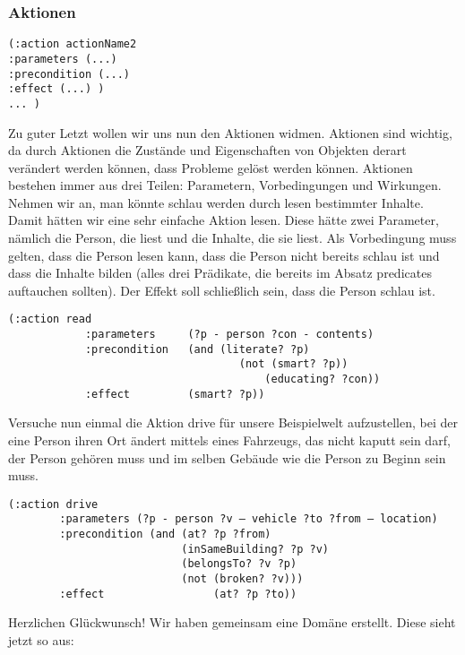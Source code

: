 \documentclass[koma,DIV=1,BCOR=1mm]{article}
\begin{document}
\subsubsection{Aktionen}
\label{sec-2-3-5}

\begin{verbatim}
(:action actionName2
:parameters (...)
:precondition (...)
:effect (...) )
... )
\end{verbatim}

Zu guter Letzt wollen wir uns nun den Aktionen widmen. Aktionen sind
wichtig, da durch Aktionen die Zustände und Eigenschaften von Objekten
derart verändert werden können, dass Probleme gelöst werden können.
Aktionen bestehen immer aus drei Teilen: Parametern, Vorbedingungen
und Wirkungen. Nehmen wir an, man könnte schlau werden durch lesen
bestimmter Inhalte. Damit hätten wir eine sehr einfache Aktion lesen.
Diese hätte zwei Parameter, nämlich die Person, die liest und die
Inhalte, die sie liest. Als Vorbedingung muss gelten, dass die Person
lesen kann, dass die Person nicht bereits schlau ist und dass die
Inhalte bilden (alles drei Prädikate, die bereits im Absatz predicates
auftauchen sollten). Der Effekt soll schließlich sein, dass die Person
schlau ist.

\begin{verbatim}
(:action read
         	:parameters 	(?p - person ?con - contents)
         	:precondition	(and (literate? ?p)
                             		(not (smart? ?p))
                            			(educating? ?con))
         	:effect 		(smart? ?p))
\end{verbatim}

Versuche nun einmal die Aktion drive für unsere Beispielwelt
aufzustellen, bei der eine Person ihren Ort ändert mittels eines
Fahrzeugs, das nicht kaputt sein darf, der Person gehören muss und im
selben Gebäude wie die Person zu Beginn sein muss.

\begin{verbatim}
(:action drive
        :parameters (?p - person ?v – vehicle ?to ?from – location)
        :precondition (and (at? ?p ?from)
                           (inSameBuilding? ?p ?v)
                           (belongsTo? ?v ?p)                                      
                           (not (broken? ?v)))
        :effect                 (at? ?p ?to))
\end{verbatim}

Herzlichen Glückwunsch! Wir haben gemeinsam eine Domäne erstellt.
Diese sieht jetzt so aus:
\end{document}
